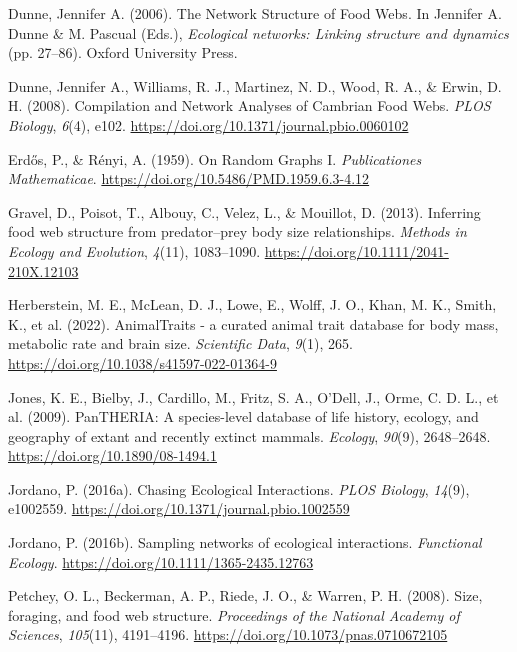 \documentclass[
]{agujournal2019}
\newlength{\cslhangindent}
\newenvironment{CSLReferences}[2] %
 {\begin{list}{}{%
  \setlength{\itemindent}{0pt}
  \setlength{\leftmargin}{0pt}
  \setlength{\parsep}{0pt}
  \ifodd #1
   \setlength{\leftmargin}{\cslhangindent}
   \setlength{\itemindent}{-1\cslhangindent}
  \fi
  \setlength{\itemsep}{#2\baselineskip}}}
 {\end{list}}
\begin{document}
\begin{CSLReferences}{1}{0}
Dunne, Jennifer A. (2006). The {Network Structure} of {Food Webs}. In
Jennifer A. Dunne \& M. Pascual (Eds.), \emph{Ecological networks:
{Linking} structure and dynamics} (pp. 27--86). {Oxford University
Press}.

Dunne, Jennifer A., Williams, R. J., Martinez, N. D., Wood, R. A., \&
Erwin, D. H. (2008). Compilation and {Network Analyses} of {Cambrian
Food Webs}. \emph{PLOS Biology}, \emph{6}(4), e102.
\url{https://doi.org/10.1371/journal.pbio.0060102}

Erdős, P., \& Rényi, A. (1959). On {Random Graphs I}.
\emph{Publicationes Mathematicae}.
\url{https://doi.org/10.5486/PMD.1959.6.3-4.12}

Gravel, D., Poisot, T., Albouy, C., Velez, L., \& Mouillot, D. (2013).
Inferring food web structure from predator--prey body size
relationships. \emph{Methods in Ecology and Evolution}, \emph{4}(11),
1083--1090. \url{https://doi.org/10.1111/2041-210X.12103}

Herberstein, M. E., McLean, D. J., Lowe, E., Wolff, J. O., Khan, M. K.,
Smith, K., et al. (2022). {AnimalTraits} - a curated animal trait
database for body mass, metabolic rate and brain size. \emph{Scientific
Data}, \emph{9}(1), 265.
\url{https://doi.org/10.1038/s41597-022-01364-9}

Jones, K. E., Bielby, J., Cardillo, M., Fritz, S. A., O'Dell, J., Orme,
C. D. L., et al. (2009). {PanTHERIA}: A species-level database of life
history, ecology, and geography of extant and recently extinct mammals.
\emph{Ecology}, \emph{90}(9), 2648--2648.
\url{https://doi.org/10.1890/08-1494.1}

Jordano, P. (2016a). Chasing {Ecological Interactions}. \emph{PLOS
Biology}, \emph{14}(9), e1002559.
\url{https://doi.org/10.1371/journal.pbio.1002559}

Jordano, P. (2016b). Sampling networks of ecological interactions.
\emph{Functional Ecology}. \url{https://doi.org/10.1111/1365-2435.12763}

Petchey, O. L., Beckerman, A. P., Riede, J. O., \& Warren, P. H. (2008).
Size, foraging, and food web structure. \emph{Proceedings of the
National Academy of Sciences}, \emph{105}(11), 4191--4196.
\url{https://doi.org/10.1073/pnas.0710672105}


\end{CSLReferences}
\end{document}
